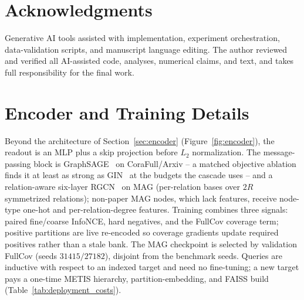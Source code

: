 \documentclass[sigconf, nonacm]{acmart}
\begin{document}
\section*{Acknowledgments}
Generative AI tools assisted with implementation, experiment orchestration, data-validation scripts, and manuscript language editing. The author reviewed and verified all AI-assisted code, analyses, numerical claims, and text, and takes full responsibility for the final work.

\appendix

\section{Encoder and Training Details}
\label{app:encoder}

Beyond the architecture of Section~\ref{sec:encoder} (Figure~\ref{fig:encoder}), the readout is an MLP plus a skip projection before $L_2$ normalization. The message-passing block is GraphSAGE~\cite{ref_graphsage} on CoraFull/Arxiv -- a matched objective ablation finds it at least as strong as GIN~\cite{ref_gin} at the budgets the cascade uses -- and a relation-aware six-layer RGCN~\cite{ref_rgcn} on MAG (per-relation bases over $2R$ symmetrized relations); non-paper MAG nodes, which lack features, receive node-type one-hot and per-relation-degree features. Training combines three signals: paired fine/coarse InfoNCE, hard negatives, and the FullCov coverage term; positive partitions are live re-encoded so coverage gradients update required positives rather than a stale bank. The MAG checkpoint is selected by validation FullCov (seeds $31415/27182$), disjoint from the benchmark seeds. Queries are inductive with respect to an indexed target and need no fine-tuning; a new target pays a one-time METIS hierarchy, partition-embedding, and FAISS build (Table~\ref{tab:deployment_costs}).

\begin{table}[t]
\centering
\caption{\textbf{Representative deployment costs.} Hierarchy loading and combined embedding-plus-index construction are measured setup runs; training is a one-time dataset cost; rank time is query encoding plus FAISS search and excludes candidate construction.}
\label{tab:deployment_costs}
\small
\setlength{\tabcolsep}{5pt}
\end{table}
\end{document}
